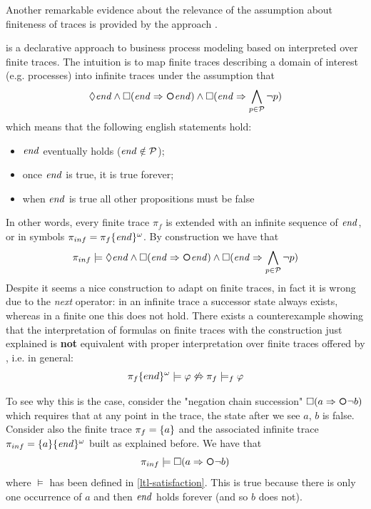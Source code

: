 \begin{example}
	Another remarkable evidence about the relevance of the assumption about finiteness of traces is provided by the \DECLARE approach \citep{Pesic:2006:DAF:2135571.2135592}. 
	
	\DECLARE is a declarative approach to business process modeling based on \LTL interpreted over finite traces. The intuition is to map finite traces describing a domain of interest (e.g. processes) into infinite traces under the assumption that 
	\begin{equation}\label{declare-assumption}
	\Diamond \End \lAND \Box(\End \Rightarrow \Next \End) \lAND \Box (\End \Rightarrow \bigwedge_{p \in \Prop} \lnot p)
	\end{equation}
	which means that the following english statements hold:
	\begin{itemize}
		\item $\mathit{end}$ eventually holds ($\mathit{end} \notin \mathcal{P}$);
		\item once $\mathit{end}$ is true, it is true forever;
		\item when $\mathit{end}$ is true all other propositions must be false
	\end{itemize}
	In other words, every finite trace $\pi_f$ is extended with an infinite sequence of $\mathit{end}$, or in symbols $\pi_{inf} = \pi_f\{\mathit{end}\}^\omega$. By construction we have that 
	\begin{equation*}
	\pi_{inf} \models \Diamond \End \lAND \Box(\End \Rightarrow \Next \End) \lAND \Box (\End \Rightarrow \bigwedge_{p \in \Prop} \lnot p)
	\end{equation*}
	Despite it seems a nice construction to adapt \LTL on finite traces, in fact it is wrong due to the \emph{next} operator: in an infinite trace a successor state always exists, whereas in a finite one this does not hold.
	There exists a counterexample showing that the interpretation of \LTL formulas on finite traces with the construction just explained is \textbf{not} equivalent with proper interpretation over finite traces offered by \LTLf, i.e. in general:
	\begin{equation}
	\pi_f\{end\}^\omega \models \varphi \not\Leftrightarrow \pi_{f}\models_f \varphi
	\end{equation}
	
	To see why this is the case, consider the \DECLARE "negation chain succession" $\Box (a \Rightarrow \Next \lnot b)$ which requires that at any point in the trace, the state after we see $a$, $b$ is false. Consider also the finite trace $\pi_f = \{a\}$ and the associated infinite trace $\pi_{inf} = \{a\}\{\mathit{end}\}^\omega$ built as explained before. We have that
	\[
	\pi_{inf} \models \Box (a \Rightarrow \Next \lnot b)
	\]
	where $\models$ has been defined in \ref{ltl-satisfaction}. This is true because there is only one occurrence of $a$ and then $\mathit{end}$ holds forever (and so $b$ does not).
	

\end{example}
